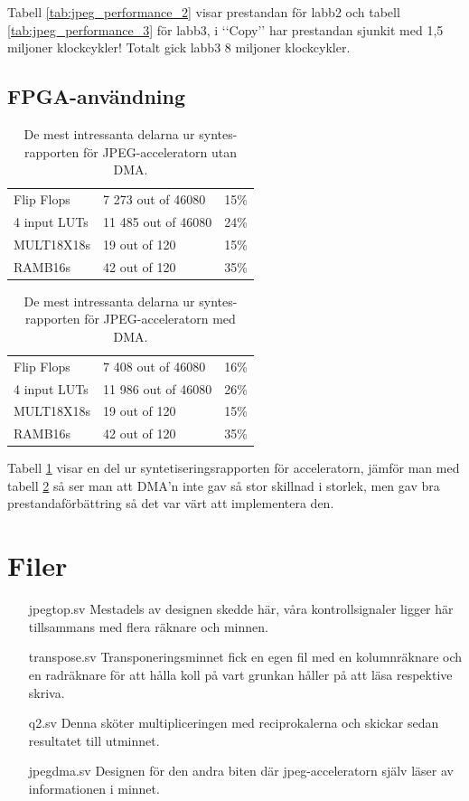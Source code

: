 \documentclass[a4paper]{article}
\begin{document}
Tabell \ref{tab:jpeg_performance_2} visar prestandan för labb2 och
tabell \ref{tab:jpeg_performance_3} för labb3, i \lq\lq{}Copy\rq\rq{}
har prestandan sjunkit med 1,5 miljoner klockcykler! Totalt gick labb3 8
miljoner klockcykler.

\subsection{FPGA-användning}
\begin{table}[H]
    \centering
    \begin{tabular}{l l l}
        Flip Flops   &      7 273 out of   46080  & 15\% \\
        4 input LUTs &      11 485 out of  46080  & 24\% \\
        MULT18X18s   &      19 out of 120  &   15\% \\
        RAMB16s      &      42 out of 120  &   35\% \\
    \end{tabular}
    \caption{ De mest intressanta delarna ur syntes-rapporten för JPEG-acceleratorn utan DMA. }
    \label{tab:fpga_usage2}
\end{table}
\begin{table}[H]
    \centering
    \begin{tabular}{l l l}
        Flip Flops   &      7 408 out of   46080  & 16\% \\
        4 input LUTs &      11 986 out of  46080  & 26\% \\
        MULT18X18s   &      19 out of 120  &   15\% \\
        RAMB16s      &      42 out of 120  &   35\% \\
    \end{tabular}
    \caption{ De mest intressanta delarna ur syntes-rapporten för JPEG-acceleratorn med DMA. }
    \label{tab:fpga_usage3}
\end{table}

Tabell \ref{tab:fpga_usage2} visar en del ur syntetiseringsrapporten för acceleratorn, jämför man med tabell \ref{tab:fpga_usage3} så ser man att DMA\rq{}n inte gav så stor skillnad i storlek, men gav bra prestandaförbättring så det var värt att implementera den.

\section{Filer}
\begin{itemize}
        \item [jpegtop.sv] Mestadels av designen skedde här, våra kontrollsignaler ligger här tillsammans med flera räknare och minnen.
        \item [transpose.sv] Transponeringsminnet fick en egen fil med en kolumnräknare och en radräknare för att hålla koll på vart grunkan håller på att läsa respektive skriva.
        \item [q2.sv] Denna sköter multipliceringen med reciprokalerna och skickar sedan resultatet till utminnet.
        \item [jpegdma.sv] Designen för den andra biten där jpeg-acceleratorn själv läser av informationen i minnet.
\end{itemize}
\end{document}
